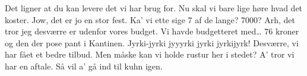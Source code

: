 \documentclass[a4paper,11pt]{article}
\begin{document}
\begin{sketch}
 Det ligner at du kan levere det vi har brug for. Nu skal vi bare lige høre hvad det koster.
 Jow, det er jo en stor fest. Ka' vi ette sige 7 af de lange?
 7000? Arh, det tror jeg desværre er udenfor vores budget. Vi havde budgetteret med\ldots
{}
 76 kroner og den der pose pant i Kantinen.
 Jyrki-jyrki jyyyrki jyrki jyrkijyrk!
 Desværre, vi har fået et bedre tilbud. Men måske kan vi holde rustur her i stedet?
 A' tror vi har en aftale. Så vil a' gå ind til kuhn igen.


\end{sketch}
\end{document}
